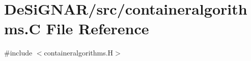 \hypertarget{containeralgorithms_8_c}{}\section{De\+Si\+G\+N\+A\+R/src/containeralgorithms.C File Reference}
\label{containeralgorithms_8_c}
{\ttfamily \#include $<$containeralgorithms.\+H$>$}\newline
